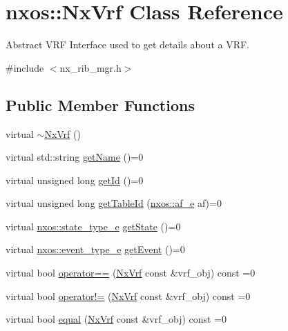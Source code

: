 \hypertarget{classnxos_1_1_nx_vrf}{}\section{nxos\+:\+:Nx\+Vrf Class Reference}
\label{classnxos_1_1_nx_vrf}


Abstract V\+RF Interface used to get details about a V\+RF.  




{\ttfamily \#include $<$nx\+\_\+rib\+\_\+mgr.\+h$>$}

\subsection*{Public Member Functions}
\begin{DoxyCompactItemize}
\item 
virtual \mbox{\hyperlink{classnxos_1_1_nx_vrf_ad5f50e3424b3d78304447600a3678e0b}{$\sim$\+Nx\+Vrf}} ()
\item 
virtual std\+::string \mbox{\hyperlink{classnxos_1_1_nx_vrf_a276a8d8170f372089a5653bdd7febfde}{get\+Name}} ()=0
\item 
virtual unsigned long \mbox{\hyperlink{classnxos_1_1_nx_vrf_a4ab30d5ff7a1d5d2abbab21652cd59fa}{get\+Id}} ()=0
\item 
virtual unsigned long \mbox{\hyperlink{classnxos_1_1_nx_vrf_a6f1529908decf0dfb531e674440d82ed}{get\+Table\+Id}} (\mbox{\hyperlink{namespacenxos_a3a667f48b94db10aa398940dc5bf72d7}{nxos\+::af\+\_\+e}} af)=0
\item 
virtual \mbox{\hyperlink{namespacenxos_a7c257059d03188765435b36e95dbb764}{nxos\+::state\+\_\+type\+\_\+e}} \mbox{\hyperlink{classnxos_1_1_nx_vrf_a443e508684e9804f14cc3526302ac8b4}{get\+State}} ()=0
\item 
virtual \mbox{\hyperlink{namespacenxos_af9a9040b7681199d386e94eb888018cb}{nxos\+::event\+\_\+type\+\_\+e}} \mbox{\hyperlink{classnxos_1_1_nx_vrf_a42bdba27e42981d74066a72c24809c98}{get\+Event}} ()=0
\item 
virtual bool \mbox{\hyperlink{classnxos_1_1_nx_vrf_adc5d2e97b5fceb4fab75c448fb54ada5}{operator==}} (\mbox{\hyperlink{classnxos_1_1_nx_vrf}{Nx\+Vrf}} const \&vrf\+\_\+obj) const =0
\item 
virtual bool \mbox{\hyperlink{classnxos_1_1_nx_vrf_a2cc336534a1caff79ade7ed9b2a5a110}{operator!=}} (\mbox{\hyperlink{classnxos_1_1_nx_vrf}{Nx\+Vrf}} const \&vrf\+\_\+obj) const =0
\item 
virtual bool \mbox{\hyperlink{classnxos_1_1_nx_vrf_ade190af878a57a5f49a329fdffd6714e}{equal}} (\mbox{\hyperlink{classnxos_1_1_nx_vrf}{Nx\+Vrf}} const \&vrf\+\_\+obj) const =0
\end{DoxyCompactItemize}


